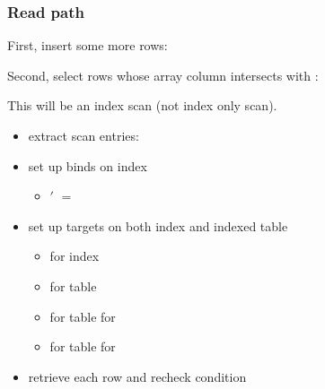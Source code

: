 \begin{frame}
  \frametitle{Read path}
  First, insert some more rows:


  \pause

  Second, select rows whose array column intersects with :

  \pause

  This will be an index scan (not index only scan).
  \pause

  \begin{itemize}
    \item extract scan entries: 
    \pause
    \item set up binds on index
      \begin{itemize}
        \item {}$'$ $=$ 
      \end{itemize}
    \pause
    \item set up targets on both index and indexed table
      \begin{itemize}
        \item {} for index
        \pause
        \item {} for table
        \pause
        \item {} for table for 
        \pause
        \item {} for table for 
      \end{itemize}
    \pause
    \item retrieve each row and recheck condition
  \end{itemize}
\end{frame}
